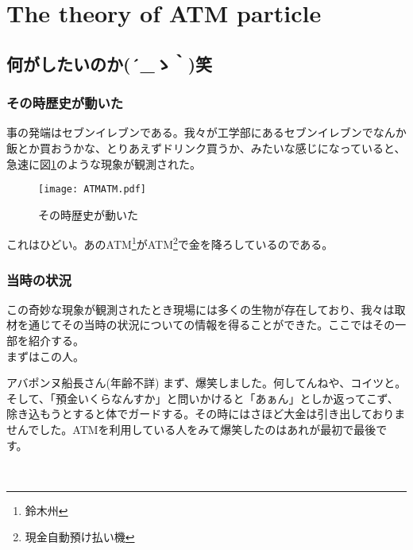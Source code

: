 \section{The theory of ATM particle}

\subsection{何がしたいのか{\sf (´\_ゝ｀)}笑}
\subsubsection{その時歴史が動いた}
事の発端はセブンイレブンである。我々が工学部にあるセブンイレブンでなんか飯とか買おうかな、とりあえずドリンク買うか、みたいな感じになっていると、急速に図\ref{ATMATM}のような現象が観測された。

\begin{figure}[H]
\centering
\texttt{[image: ATMATM.pdf]}
    \caption{その時歴史が動いた}
    \label{ATMATM}
\end{figure}

これはひどい。あのATM\footnote{鈴木州}がATM\footnote{現金自動預け払い機}で金を降ろしているのである。

\subsubsection{当時の状況}
この奇妙な現象が観測されたとき現場には多くの生物が存在しており、我々は取材を通じてその当時の状況についての情報を得ることができた。ここではその一部を紹介する。\\

まずはこの人。\\

\begin{itembox}[c]{アバポンヌ船長さん(年齢不詳)}
まず、爆笑しました。何してんねや、コイツと。そして、「預金いくらなんすか」と問いかけると「あぁん」としか返ってこず、除き込もうとすると体でガードする。その時にはさほど大金は引き出しておりませんでした。ATMを利用している人をみて爆笑したのはあれが最初で最後です。
\end{itembox}
\\

